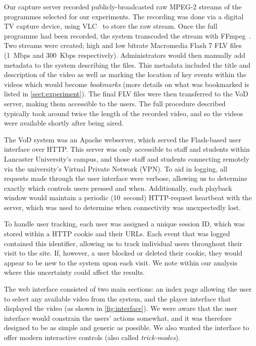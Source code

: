 Our capture server recorded publicly-broadcasted raw MPEG-2 streams of the programmes selected for our experiments. The recording was done via a digital TV capture device, using VLC~\cite{vlc} to store the raw stream. Once the full programme had been recorded, the system transcoded the stream with FFmpeg~\cite{ffmpeg}. Two streams were created; high and low bitrate Macromedia Flash 7 FLV files (1~Mbps and 300~Kbps respectively). Administrators would then manually add metadata to the system describing the files. This metadata included the title and description of the video as well as marking the location of key events within the videos which would become \emph{bookmarks} (more details on what was bookmarked is listed in \autoref{sect:experiment}). The final FLV files were then transferred to the VoD server, making them accessible to the users. The full procedure described typically took around twice the length of the recorded video, and so the videos were available shortly after being aired.

The VoD system was an Apache webserver, which served the Flash-based user interface over HTTP. This server was only accessible to staff and students within Lancaster University's campus, and those staff and students connecting remotely via the university's Virtual Private Network (VPN). To aid in logging, all requests made through the user interface were verbose, allowing us to determine exactly which controls users pressed and when. Additionally, each playback window would maintain a periodic (10~second) HTTP-request heartbeat with the server, which was used to determine when connectivity was unexpectedly lost.

To handle user tracking, each user was assigned a unique session ID, which was stored within a HTTP cookie and their URLs. Each event that was logged contained this identifier, allowing us to track individual users throughout their visit to the site. If, however, a user blocked or deleted their cookie, they would appear to be new to the system upon each visit. We note within our analysis where this uncertainty could affect the results.

The web interface consisted of two main sections: an index page allowing the user to select any available video from the system, and the player interface that displayed the video (as shown in \autoref{fig:interface}). We were aware that the user interface would constrain the users' actions somewhat, and it was therefore designed to be as simple and generic as possible. We also wanted the interface to offer modern interactive controls (also called \emph{trick-modes}).

